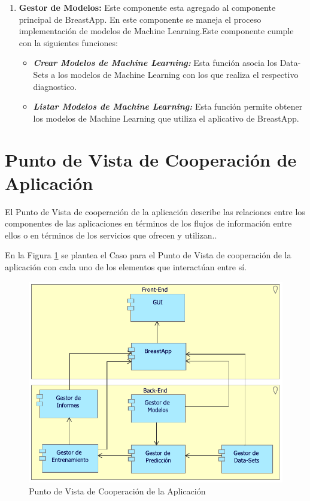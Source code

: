 \begin{enumerate}[label=\textbf{\arabic*})]
\item  \textbf{Gestor de Modelos:} Este componente esta agregado al componente principal de BreastApp. En este componente se maneja el proceso implementación de  modelos de Machine Learning.Este componente cumple con la siguientes funciones:

\begin{itemize}
	\item  \textbf{\textit{Crear Modelos de Machine Learning:}} Esta función asocia los Data-Sets a los modelos de Machine Learning con los que realiza el respectivo diagnostico.
	
	\item  \textbf{\textit{Listar Modelos de Machine Learning:}} Esta función permite obtener los modelos de Machine Learning que utiliza el aplicativo de BreastApp.
\end{itemize}	
		
\end{enumerate}

\newpage
\section{Punto de Vista de Cooperación de Aplicación}
El Punto de Vista de cooperación de la aplicación describe las relaciones entre los componentes de las aplicaciones en términos de los flujos de información entre ellos o en términos de los servicios que ofrecen y utilizan.\cite{BolanosCastro2019}.

En la Figura \ref{PvCooperacionApp} se plantea el Caso para el Punto de Vista de cooperación de la aplicación con cada uno de los elementos que interactúan entre sí. 

\begin{figure}[h!]
	\centering
	\includegraphics[width=1\linewidth]{ARQUITECTURA/imgs/CapaAplicacion/2_PvCooperacionApp}
	\caption{Punto de Vista de Cooperación de la Aplicación}
	\label{PvCooperacionApp}
\end{figure}


